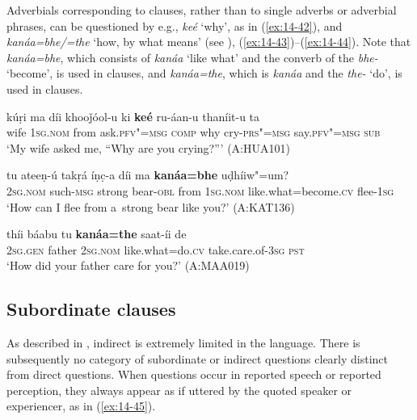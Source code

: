 Adverbials corresponding to clauses, rather than to single adverbs or adverbial phrases, can be questioned by e.g., \textit{keé} `why', as in (\ref{ex:14-42}), and \textit{kanáa=bhe/=the} `how, by what means' (see ), (\ref{ex:14-43})--(\ref{ex:14-44}). Note that \textit{kanáa=bhe}, which consists of \textit{kanáa} `like what' and the converb of the  \textit{bhe-} `become', is used in  clauses, and \textit{kanáa=the}, which is \textit{kanáa} and the  \textit{the-} `do', is used in  clauses.

\begin{exe}
\ex
\label{ex:14-42}
\gll kúṛi ma díi khooǰóol-u ki \textbf{keé} ru-áan-u thaníit-u ta\\
wife \textsc{1sg.nom} from ask.\textsc{pfv"=msg} \textsc{comp} why  cry-\textsc{prs"=msg} say.\textsc{pfv"=msg} \textsc{sub}\\
\glt `My wife asked me, ``Why are you crying?''' (A:HUA101)

\ex
\label{ex:14-43}
\gll tu ateeṇ-ú takṛá íṇc̣-a díi ma \textbf{kanáa=bhe} uḍhíiw"=um? \\
\textsc{2sg.nom} such-\textsc{msg} strong bear-\textsc{obl} from \textsc{1sg.nom}  like.what=become.\textsc{cv} flee-\textsc{1sg} \\
\glt `How can I flee from a~strong bear like you?' (A:KAT136)

\ex
\label{ex:14-44}
\gll thíi báabu tu \textbf{kanáa=the} saat-íi de \\
\textsc{2sg.gen} father \textsc{2sg.nom} like.what=do.\textsc{cv} take.care.of-\textsc{3sg} \textsc{pst} \\
\glt `How did your father care for you?' (A:MAA019)
\end{exe}

\subsection{Subordinate  clauses}
\label{subsec:14-2-3}


As described in , indirect  is extremely limited in the language. There is subsequently no category of subordinate or indirect questions clearly distinct from direct questions. When questions occur in reported speech or reported perception, they always appear as if uttered by the quoted speaker or experiencer, as in (\ref{ex:14-45}).

